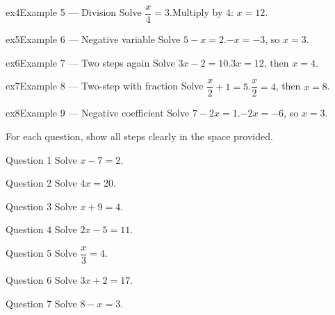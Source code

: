 \documentclass[11pt]{article}
\begin{document}
\begin{example}{ex4}{Example 5 --- Division}
Solve $\dfrac{x}{4}=3$.\soln Multiply by $4$: $x=12$.
\end{example}

\begin{example}{ex5}{Example 6 --- Negative variable}
Solve $5-x=2$.\soln $-x=-3$, so $x=3$.
\end{example}

\begin{example}{ex6}{Example 7 --- Two steps again}
Solve $3x-2=10$.\soln $3x=12$, then $x=4$.
\end{example}

\begin{example}{ex7}{Example 8 --- Two-step with fraction}
Solve $\dfrac{x}{2}+1=5$.\soln $\dfrac{x}{2}=4$, then $x=8$.
\end{example}

\begin{example}{ex8}{Example 9 --- Negative coefficient}
Solve $7-2x=1$.\soln $-2x=-6$, so $x=3$.
\end{example}

\clearpage
{}
For each question, show all steps clearly in the space provided.

\begin{qbox}{Question 1}
Solve $x-7=2$.\workspace{1.8cm}
\end{qbox}

\begin{qbox}{Question 2}
Solve $4x=20$.\workspace{1.8cm}
\end{qbox}

\begin{qbox}{Question 3}
Solve $x+9=4$.\workspace{1.8cm}
\end{qbox}

\begin{qbox}{Question 4}
Solve $2x-5=11$.\workspace{2.0cm}
\end{qbox}

\begin{qbox}{Question 5}
Solve $\dfrac{x}{3}=4$.\workspace{1.8cm}
\end{qbox}

\begin{qbox}{Question 6}
Solve $3x+2=17$.\workspace{2.0cm}
\end{qbox}

\begin{qbox}{Question 7}
Solve $8-x=3$.\workspace{2.0cm}
\end{qbox}
\end{document}

